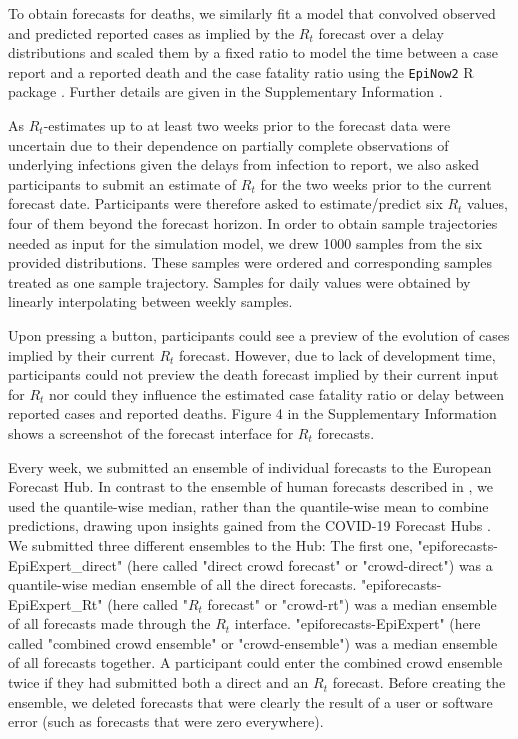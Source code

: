 \documentclass[10pt,a4paper,twocolumn]{article}
\begin{document}
To obtain forecasts for deaths, we similarly fit a model that convolved observed and predicted reported cases as implied by the $R_t$ forecast over a  delay distributions \cite{sherrattExploringSurveillanceData2021, abbottEstimatingTimevaryingReproduction2020a} and scaled them by a fixed ratio to model the time between a case report and a reported death and the case fatality ratio using the \texttt{EpiNow2} \textsf{R} package \citep{epinow2}. Further details are given in the Supplementary Information \cite{bosseSupplementaryInformationHuman2023}.

As $R_t$-estimates up to at least two weeks prior to the forecast data were uncertain due to their dependence on partially complete observations of underlying infections given the delays from infection to report, we also asked participants to submit an estimate of $R_t$ for the two weeks prior to the current forecast date. Participants were therefore asked to estimate/predict six $R_t$ values, four of them beyond the forecast horizon. In order to obtain sample trajectories needed as input for the simulation model, we drew 1000 samples from the six provided distributions. These samples were ordered and corresponding samples treated as one sample trajectory. Samples for daily values were obtained by linearly interpolating between weekly samples. 

Upon pressing a button, participants could see a preview of the evolution of cases implied by their current $R_t$ forecast. However, due to lack of development time, participants could not preview the death forecast implied by their current input for $R_t$ nor could they influence the estimated case fatality ratio or delay between reported cases and reported deaths. Figure 4 in the Supplementary Information \cite{bosseSupplementaryInformationHuman2023} shows a screenshot of the forecast interface for $R_t$ forecasts. 

Every week, we submitted an ensemble of individual forecasts to the European Forecast Hub. In contrast to the ensemble of human forecasts described in \citet{bosseComparingHumanModelbased2022}, we used the quantile-wise median, rather than the quantile-wise mean to combine predictions, drawing upon insights gained from the COVID-19 Forecast Hubs \citep{rayComparingTrainedUntrained2022}. 
We submitted three different ensembles to the Hub: The first one, "epiforecasts-EpiExpert\_direct" (here called "direct crowd forecast" or "crowd-direct") was a quantile-wise median ensemble of all the direct forecasts. "epiforecasts-EpiExpert\_Rt" (here called "$R_t$ forecast" or "crowd-rt") was a median ensemble of all forecasts made through the $R_t$ interface. "epiforecasts-EpiExpert" (here called "combined crowd ensemble" or "crowd-ensemble") was a median ensemble of all forecasts together. A participant could enter the combined crowd ensemble twice if they had submitted both a direct and an $R_t$ forecast. Before creating the ensemble, we deleted forecasts that were clearly the result of a user or software error (such as forecasts that were zero everywhere).
\end{document}
